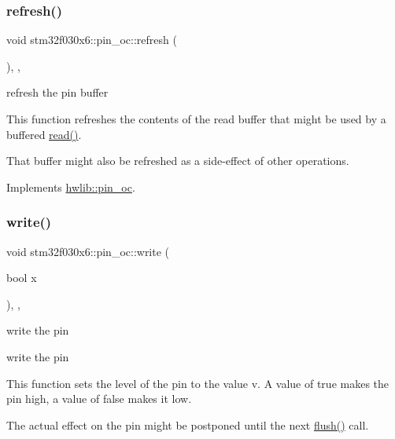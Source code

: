 \subsubsection{\texorpdfstring{refresh()}{refresh()}}
{\footnotesize\ttfamily void stm32f030x6\+::pin\+\_\+oc\+::refresh (\begin{DoxyParamCaption}{ }\end{DoxyParamCaption})\hspace{0.3cm}{\ttfamily [inline]}, {\ttfamily [override]}, {\ttfamily [virtual]}}





refresh the pin buffer

This function refreshes the contents of the read buffer that might be used by a buffered \hyperlink{classstm32f030x6_1_1pin__oc_a97615ebdacdd8405e87f8f6440e5fce1}{read()}.

That buffer might also be refreshed as a side-\/effect of other operations. 

Implements \hyperlink{classhwlib_1_1pin__oc_a573740f6f790c5792efc9cdd44cc73b3}{hwlib\+::pin\+\_\+oc}.

\mbox{\label{classstm32f030x6_1_1pin__oc_a08be59f5868ae70133e95d172318043b}} 
\subsubsection{\texorpdfstring{write()}{write()}}
{\footnotesize\ttfamily void stm32f030x6\+::pin\+\_\+oc\+::write (\begin{DoxyParamCaption}\item[{bool}]{x }\end{DoxyParamCaption})\hspace{0.3cm}{\ttfamily [inline]}, {\ttfamily [override]}, {\ttfamily [virtual]}}





write the pin

write the pin

This function sets the level of the pin to the value v. A value of true makes the pin high, a value of false makes it low.

The actual effect on the pin might be postponed until the next \hyperlink{classstm32f030x6_1_1pin__oc_afa293f1a0ee8f1cb4936521df144453e}{flush()} call.

